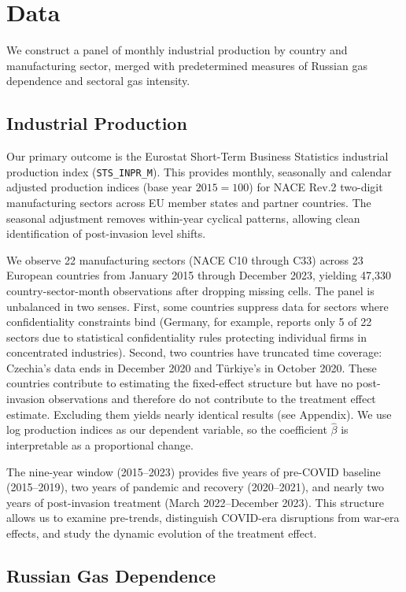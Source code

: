 \documentclass[12pt]{article}
\begin{document}
\section{Data}

We construct a panel of monthly industrial production by country and manufacturing sector, merged with predetermined measures of Russian gas dependence and sectoral gas intensity.

\subsection{Industrial Production}

Our primary outcome is the Eurostat Short-Term Business Statistics industrial production index (\texttt{STS\_INPR\_M}). This provides monthly, seasonally and calendar adjusted production indices (base year $2015 = 100$) for NACE Rev.2 two-digit manufacturing sectors across EU member states and partner countries. The seasonal adjustment removes within-year cyclical patterns, allowing clean identification of post-invasion level shifts.

We observe 22 manufacturing sectors (NACE C10 through C33) across 23 European countries from January 2015 through December 2023, yielding 47,330 country-sector-month observations after dropping missing cells. The panel is unbalanced in two senses. First, some countries suppress data for sectors where confidentiality constraints bind (Germany, for example, reports only 5 of 22 sectors due to statistical confidentiality rules protecting individual firms in concentrated industries). Second, two countries have truncated time coverage: Czechia's data ends in December 2020 and T\"{u}rkiye's in October 2020. These countries contribute to estimating the fixed-effect structure but have no post-invasion observations and therefore do not contribute to the treatment effect estimate. Excluding them yields nearly identical results (see Appendix). We use log production indices as our dependent variable, so the coefficient $\hat{\beta}$ is interpretable as a proportional change.

The nine-year window (2015--2023) provides five years of pre-COVID baseline (2015--2019), two years of pandemic and recovery (2020--2021), and nearly two years of post-invasion treatment (March 2022--December 2023). This structure allows us to examine pre-trends, distinguish COVID-era disruptions from war-era effects, and study the dynamic evolution of the treatment effect.

\subsection{Russian Gas Dependence}
\end{document}
